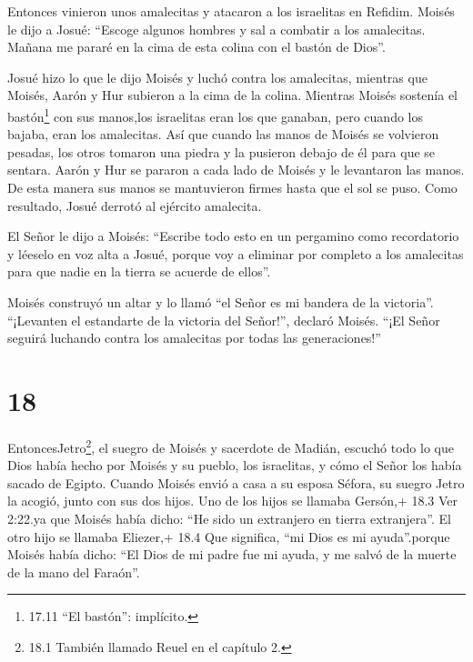  Entonces vinieron unos amalecitas y atacaron a los
israelitas en Refidim.  Moisés le dijo a Josué: ``Escoge
algunos hombres y sal a combatir a los amalecitas. Mañana me pararé en
la cima de esta colina con el bastón de Dios''.

 Josué hizo lo que le dijo Moisés y luchó contra los
amalecitas, mientras que Moisés, Aarón y Hur subieron a la cima de la
colina.  Mientras Moisés sostenía el bastón\footnote{17.11
  ``El bastón'': implícito.} con sus manos,los israelitas eran los que
ganaban, pero cuando los bajaba, eran los amalecitas.  Así
que cuando las manos de Moisés se volvieron pesadas, los otros tomaron
una piedra y la pusieron debajo de él para que se sentara. Aarón y Hur
se pararon a cada lado de Moisés y le levantaron las manos. De esta
manera sus manos se mantuvieron firmes hasta que el sol se puso.
 Como resultado, Josué derrotó al ejército amalecita.

 El Señor le dijo a Moisés: ``Escribe todo esto en un
pergamino como recordatorio y léeselo en voz alta a Josué, porque voy a
eliminar por completo a los amalecitas para que nadie en la tierra se
acuerde de ellos''.

 Moisés construyó un altar y lo llamó ``el Señor es mi
bandera de la victoria''.  ``¡Levanten el estandarte de la
victoria del Señor!'', declaró Moisés. ``¡El Señor seguirá luchando
contra los amalecitas por todas las generaciones!''

\hypertarget{section-17}{%
\section{18}\label{section-17}}

 EntoncesJetro\footnote{18.1 También llamado Reuel en el
  capítulo 2.}, el suegro de Moisés y sacerdote de Madián, escuchó todo
lo que Dios había hecho por Moisés y su pueblo, los israelitas, y cómo
el Señor los había sacado de Egipto.  Cuando Moisés envió a
casa a su esposa Séfora, su suegro Jetro la acogió,  junto
con sus dos hijos. Uno de los hijos se llamaba Gersón,+ 18.3 Ver 2:22.ya
que Moisés había dicho: ``He sido un extranjero en tierra extranjera''.
 El otro hijo se llamaba Eliezer,+ 18.4 Que significa, ``mi
Dios es mi ayuda''.porque Moisés había dicho: ``El Dios de mi padre fue
mi ayuda, y me salvó de la muerte de la mano del Faraón''.

